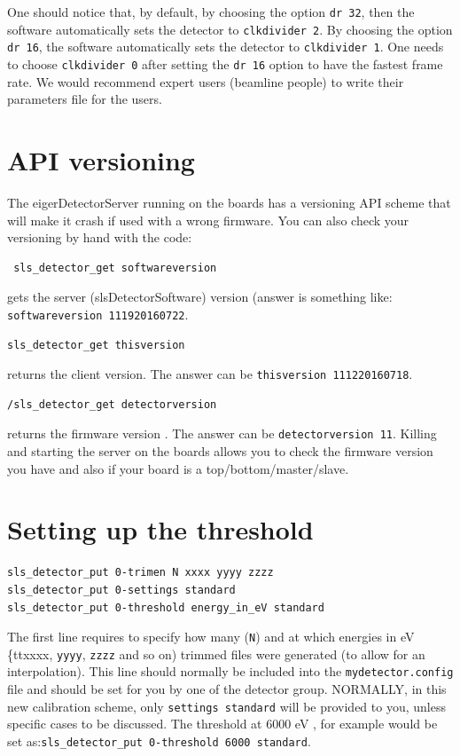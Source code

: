 \documentclass{article}
\begin{document}
One should notice that, by default, by choosing the option {\tt{dr 32}}, then the software automatically sets the detector to  {\tt{clkdivider 2}}. By choosing the option {\tt{dr 16}}, the software automatically sets the detector to  {\tt{clkdivider 1}}. One needs to choose {\tt{clkdivider 0}} after setting the {\tt{dr 16}} option to have the fastest frame rate. 
We would recommend expert users (beamline people) to write their parameters file for the users. 

\section{API versioning} \label{api}
The eigerDetectorServer running on the boards has a versioning API scheme that will make it crash if used with a wrong firmware.
You can also check your versioning by hand with the code:
\begin{verbatim}
 sls_detector_get softwareversion
\end{verbatim}
gets the server (slsDetectorSoftware) version (answer is something like: {\tt{softwareversion 111920160722}}.
 \begin{verbatim}
sls_detector_get thisversion 
\end{verbatim}
returns the client version. The answer can be {\tt{thisversion 111220160718}}.
\begin{verbatim}
/sls_detector_get detectorversion
\end{verbatim}
returns the firmware version . The answer can be {\tt{detectorversion 11}}.
Killing and starting the server on the boards allows you to check the firmware version you have and also if your board is a top/bottom/master/slave.

\section{Setting up the threshold}
\begin{verbatim}
sls_detector_put 0-trimen N xxxx yyyy zzzz
sls_detector_put 0-settings standard 
sls_detector_put 0-threshold energy_in_eV standard
\end{verbatim}
The first line requires to specify how many ({\tt{N}}) and at which energies in eV {\{tt{xxxx}}, {\tt{yyyy}}, {\tt{zzzz}} and so on) trimmed files were generated (to allow for an interpolation). This line should normally be included into the {\tt{mydetector.config}} file and should be set for you by one of the detector group.
NORMALLY, in this new calibration scheme, only {\tt{settings standard}} will be provided to you, unless specific cases to be discussed.
The threshold at 6000 eV , for example would be set as:{\tt{sls\_detector\_put 0-threshold 6000 standard}}.
\end{document}
